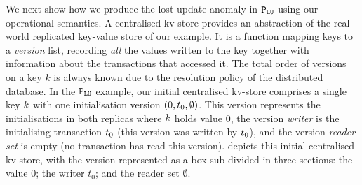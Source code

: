 We next show how we produce the lost update anomaly in
\(\mathtt{P}_{\mathtt{LU}}\) using our operational semantics.  
A centralised kv-store provides an abstraction of the real-world
replicated key-value store of our example.  It is a function mapping
keys to a {\em version} list, recording {\em all} the values written to the key
together with information about the transactions that
accessed it. The total order of versions on a key $k$ is always known
due to the resolution policy of the distributed database. 
In the \(\mathtt{P}_{\mathtt{LU}}\) example, our initial centralised
kv-store comprises a single key \(k\)  with  one initialisation version \((0, t_{0}, \emptyset)\).
This version represents the initialisations in both replicas where \(k\) holds value \(0\), 
 the version \emph{writer} is the initialising transaction
\(t_0\) (this version was written by \(t_0\)), 
and  the version \emph{reader set} is empty (no transaction has read this version). 
 depicts this initial centralised kv-store, with the version
represented as a box sub-divided in three sections: the value \(0\);
the writer \(t_0\); and the reader set \(\emptyset\). 

